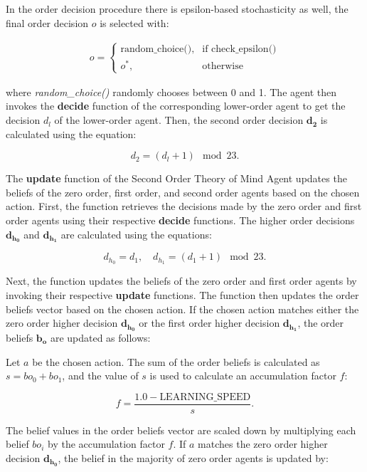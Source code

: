 In the order decision procedure there is epsilon-based stochasticity as well, the final order decision $o$ is selected with:

\[
\begin{aligned}
\text{{$o$}} =
\begin{cases}
\text{{random\_choice()}}, & \text{{if }} \text{{check\_epsilon()}} \\
o^*, & \text{{otherwise}}
\end{cases}
\end{aligned}
\]

where \textit{random\_choice()} randomly chooses between 0 and 1. The agent then invokes the \textbf{decide} function of the corresponding lower-order agent to get the decision $d_l$ of the lower-order agent. Then, the second order decision $\mathbf{d_2}$  is calculated using the equation:

\label{eq:second-order-decide}
\[
d_2 = (d_l + 1) \mod 23.
\]


The \textbf{update} function of the Second Order Theory of Mind Agent updates the beliefs of the zero order, first order, and second order agents based on the chosen action. First, the function retrieves the decisions made by the zero order and first order agents using their respective \textbf{decide} functions. The higher order decisions $\mathbf{d_{h_0}}$ and $\mathbf{d_{h_1}}$ are calculated using the equations:

\[
d_{h_0} = d_1, \quad d_{h_1} = (d_1 + 1) \mod 23.
\]

Next, the function updates the beliefs of the zero order and first order agents by invoking their respective \textbf{update} functions. The function then updates the order beliefs vector based on the chosen action. If the chosen action matches either the zero order higher decision $\mathbf{d_{h_0}}$ or the first order higher decision $\mathbf{d_{h_1}}$, the order beliefs $\mathbf{b_o}$ are updated as follows:

Let $a$ be the chosen action. The sum of the order beliefs is calculated as $s = b{o_0} + b{o_1}$, and the value of $s$ is used to calculate an accumulation factor $f$:

\[
f = \frac{{1.0 - \text{{LEARNING\_SPEED}}}}{s}.
\]

The belief values in the order beliefs vector are scaled down by multiplying each belief $b{o_i}$ by the accumulation factor $f$. If $a$ matches the zero order higher decision $\mathbf{d_{h_0}}$, the belief in the majority of zero order agents is updated by:

